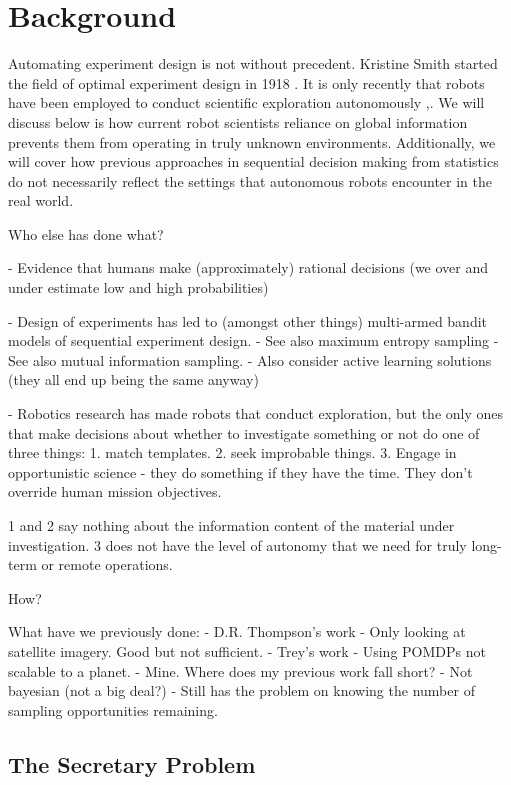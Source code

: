 \section{Background}
\label{sec:background}

Automating experiment design is not without precedent.  Kristine Smith started the field of optimal experiment design in 1918 \cite{smith1918standard}.
It is only recently that robots have been employed to conduct scientific exploration autonomously \cite{wagner2001science},\cite{king2004functional}.  We will discuss below is how current robot scientists reliance on global information prevents them from operating in truly unknown environments.  Additionally, we will cover how previous approaches in sequential decision making from statistics do not necessarily reflect the settings that autonomous robots encounter in the real world.


	Who else has done what?

- Evidence that humans make (approximately) rational decisions (we over and under estimate low and high probabilities)

	- Design of experiments has led to (amongst other things) multi-armed bandit models of sequential experiment design.
	- See also maximum entropy sampling
	- See also mutual information sampling.
- Also consider active learning solutions (they all end up being the same anyway)

	- Robotics research has made robots that conduct exploration, but the only ones that make decisions about whether to investigate something or not do one of three things:
	1. match templates.
	2. seek improbable things.
	3. Engage in opportunistic science - they do something if they have the time.  They don't override human mission objectives.

	1 and 2 say nothing about the information content of the material under investigation.
	3 does not have the level of autonomy that we need for truly long-term or remote operations.

	How?

	What have we previously done:
	- D.R. Thompson's work
	- Only looking at satellite imagery.  Good but not sufficient.
	- Trey's work
	- Using POMDPs not scalable to a planet.
	- Mine. Where does my previous work fall short?
- Not bayesian (not a big deal?)
	- Still has the problem on knowing the number of sampling opportunities remaining.

\subsection{The Secretary Problem}

